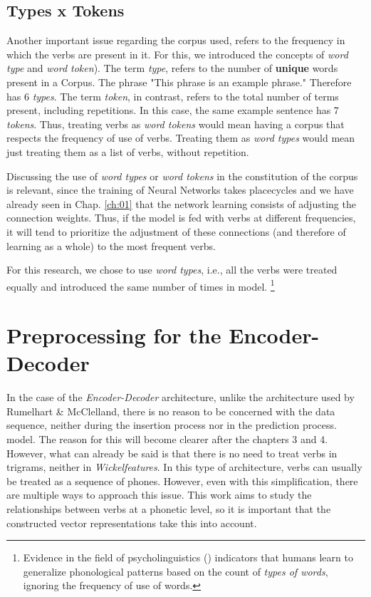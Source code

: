 \subsection{Types x Tokens}
Another important issue regarding the corpus used, refers to the frequency in which the verbs are present in it. For this, we introduced the concepts of \textit{word type} and \textit{word token}\cite{peirce:1906}). The term \textit{type}, refers to the number of  \textbf{unique} words present in a Corpus. The phrase "This phrase is an example phrase." Therefore has 6 \textit{types}. The term \textit{token}, in contrast, refers to the total number of terms present, including repetitions. In this case, the same example sentence has 7 \textit{tokens}. Thus, treating verbs as \textit{word tokens} would mean having a corpus that respects the frequency of use of verbs. Treating them as \textit{word types} would mean just treating them as a list of verbs, without repetition.

Discussing the use of \textit{word types} or \textit{word tokens} in the constitution of the corpus is relevant, since the training of Neural Networks takes place{cycles} and we have already seen in Chap. \ref{ch:01} that the network learning consists of adjusting the connection weights. Thus, if the model is fed with verbs at different frequencies, it will tend to prioritize the adjustment of these connections (and therefore of learning as a whole) to the most frequent verbs.

For this research, we chose to use \textit{word types}, i.e., all the verbs were treated equally and introduced the same number of times in model. \footnote{Evidence in the field of psycholinguistics (\cite{Bybee:1995, janet:2018}) indicators that humans learn to generalize phonological patterns based on the count of \textit{types of words}, ignoring the frequency of use of words.}

\section{Preprocessing for the Encoder-Decoder}

In the case of the \textit{Encoder-Decoder} architecture, unlike the architecture used by Rumelhart \& McClelland, there is no reason to be concerned with the data sequence, neither during the insertion process nor in the prediction process. model. The reason for this will become clearer after the chapters 3 and 4. However, what can already be said is that there is no need to treat verbs in trigrams, neither in \textit{Wickelfeatures}. In this type of architecture, verbs can usually be treated as a sequence of phones. However, even with this simplification, there are multiple ways to approach this issue. This work aims to study the relationships between verbs at a phonetic level, so it is important that the constructed vector representations take this into account.

